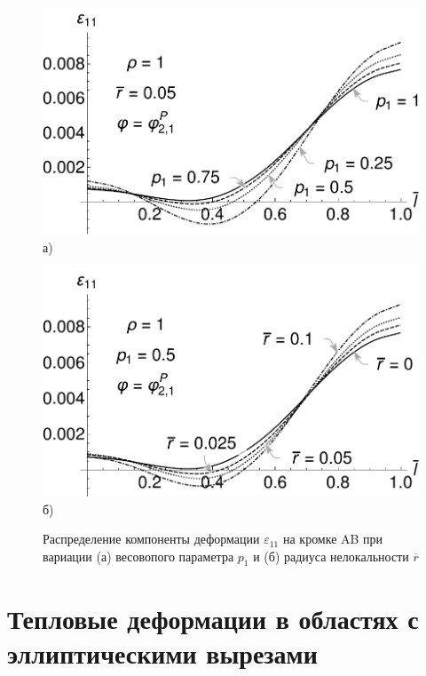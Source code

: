 \begin{figure}[ht]
    \begin{minipage}[b][][b]{0.49\linewidth}\centering
        \includegraphics[width=\linewidth]{pics/KirshABEps11VariationP1.pdf} \\ а)
    \end{minipage}
    \hfill
    \begin{minipage}[b][][b]{0.49\linewidth}\centering
        \includegraphics[width=\linewidth]{pics/KirshABEps11VariationR.pdf} \\ б)
    \end{minipage}
    \caption{Распределение компоненты деформации $\varepsilon_{11}$ на кромке AB при вариации (а) весовопого параметра $p_1$ и (б) радиуса нелокальности $\overline{r}$}
    \label{fig:EpsABVarP1AndR}
\end{figure}

\section{Тепловые деформации в областях с эллиптическими вырезами}\label{sec:ResultsAnalysis/ThermalKirshProblem}

